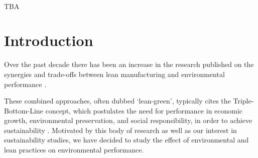 \documentclass[]{article}
\makeatletter
\renewenvironment{abstract} {\vspace*{-1pc}\trivlist\item[]\leftskip\oupIndent\hrulefill\par\vskip4pt\noindent\textbf{\abstractname}\mbox{\null}\\}{\par\noindent\hrulefill\endtrivlist}
\def\author#1{\gdef\@author{\hskip-\dimexpr(\tabcolsep)\hskip\oupIndent\parbox{\dimexpr\textwidth-\oupIndent}{\centering\bfseries#1}}}
\def\title#1{\gdef\@title{\centering\bfseries\ifx\@articleType\@empty\else\@articleType\\\fi#1}}
\let\@articleType\@empty \def\articletype#1{\gdef\@articleType{{\normalfont\itshape#1}}}
\makeatother
\begin{document}
\title{JIT and Environmental Performance: an empirical analysis}
\author{Alessa Aila\textsuperscript{1}\thanks{E-mail: alessa.aila@aalto.fi}{ },
            Astrid Holstr{\"{o}}m\textsuperscript{1}\thanks{E-mail: astrid.holmstrom@aalto.fi}{ },
            Eemil Rantala\textsuperscript{1}\thanks{E-mail: eemil.rantala@aalto.fi}{ },
            John Anderson\textsuperscript{1}\thanks{E-mail: john.anderson@aalto.fi}{ } and
            Valtteri Luodem{\"{a}}ki\textsuperscript{1}\thanks{E-mail: valtteri.luodemaki@aalto.fi}{ }~\\[-3pt]\normalsize\normalfont\itshape 
~\\\textsuperscript{1}{Department of Industrial Engineering and Management\unskip, Aalto University}}
\def\RunningHead{{Lean JIT and Environmental Performance: an empirical analysis}}

\maketitle 


\begin{abstract}
TBA
\end{abstract}\def\keywordstitle{Keywords}
    
\section{Introduction}
Over the past decade there has been an increase in the research published on the synergies and trade-offs between lean manufacturing and environmental performance \citep{henaoLeanManufacturingSustainable2019, abualfaraaLeanGreenManufacturingPractices2020, diesteRelationshipLeanEnvironmental2019, lobomesquitaExploringRelationshipsIntegrating2022, garza-reyesLeanGreenSystematic2015, kingLeanGreenEmpirical2009}.

These combined approaches, often dubbed `lean-green', typically cites the Triple-Bottom-Line concept, which postulates the need for performance in economic growth, environmental preservation, and social responsibility, in order to achieve sustainability \citep{henaoLeanManufacturingSustainable2019}. 
Motivated by this body of research as well as our interest in sustainability studies, we have decided to study the effect of environmental and lean practices on environmental performance. 
\end{document}
